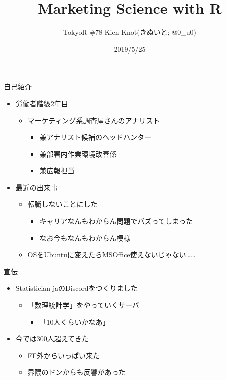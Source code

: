 \documentclass[ignorenonframetext,]{beamer}
\title{Marketing Science with R}
\author{TokyoR \#78 Kien Knot(きぬいと; @0\_u0)}
\date{2019/5/25}
\providecommand{\tightlist}{%
  \setlength{\itemsep}{0pt}\setlength{\parskip}{0pt}}
\begin{document}
\frame{\titlepage}

\begin{frame}{自己紹介}

\begin{itemize}
\tightlist
\item
  労働者階級2年目

  \begin{itemize}
  \tightlist
  \item
    マーケティング系調査屋さんのアナリスト

    \begin{itemize}
    \tightlist
    \item
      兼アナリスト候補のヘッドハンター
    \item
      兼部署内作業環境改善係
    \item
      兼広報担当
    \end{itemize}
  \end{itemize}
\item
  最近の出来事

  \begin{itemize}
  \tightlist
  \item
    転職しないことにした

    \begin{itemize}
    \tightlist
    \item
      キャリアなんもわからん問題でバズってしまった
    \item
      なお今もなんもわからん模様
    \end{itemize}
  \item
    OSをUbuntuに変えたらMSOffice使えないじゃない\ldots{}\ldots{}
  \end{itemize}
\end{itemize}

\end{frame}

\begin{frame}{宣伝}

\begin{itemize}
\tightlist
\item
  Statistician-jaのDiscordをつくりました

  \begin{itemize}
  \tightlist
  \item
    「数理統計学」をやっていくサーバ

    \begin{itemize}
    \tightlist
    \item
      「10人くらいかなあ」
    \end{itemize}
  \end{itemize}
\item
  今では300人超えてきた

  \begin{itemize}
  \tightlist
  \item
    FF外からいっぱい来た
  \item
    界隈のドンからも反響があった
  \end{itemize}
\end{itemize}

\end{frame}
\end{document}
